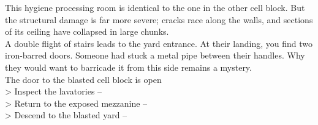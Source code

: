 This hygiene processing room is identical to the one in the other cell block. But the structural damage is far more severe; cracks race along the walls, and sections of its ceiling have collapsed in large chunks.\\

A double flight of stairs leads to the yard entrance. At their landing, you find two iron-barred doors. Someone had stuck a metal pipe between their handles. Why they would want to barricade it from this side remains a mystery.\\
 The door to the blasted cell block is open\\

> Inspect the lavatories -- \\
> Return to the exposed mezzanine -- \\
> Descend to the blasted yard -- 